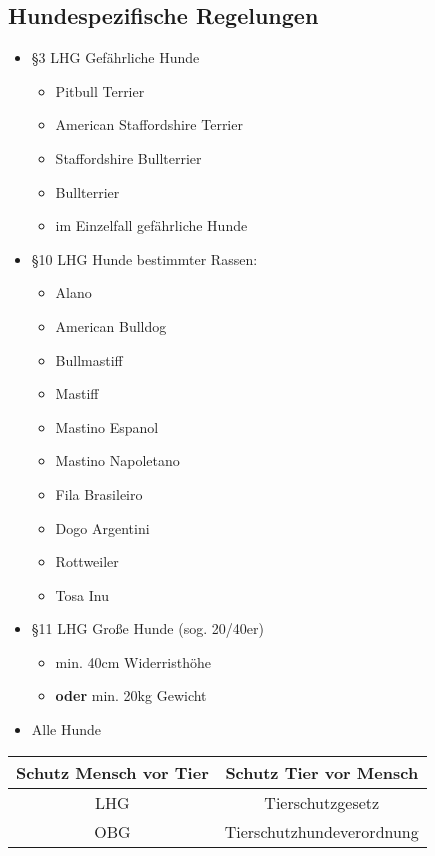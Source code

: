     \subsection{Hundespezifische Regelungen}
    \begin{itemize}
        \item §3 LHG Gefährliche Hunde
        \begin{itemize}
            \item Pitbull Terrier
            \item American Staffordshire Terrier
            \item Staffordshire Bullterrier
            \item Bullterrier
            \item im Einzelfall gefährliche Hunde
        \end{itemize}
        \item §10 LHG Hunde bestimmter Rassen:
        \begin{itemize}
            \item Alano
            \item American Bulldog
            \item Bullmastiff
            \item Mastiff
            \item Mastino Espanol
            \item Mastino Napoletano
            \item Fila Brasileiro
            \item Dogo Argentini
            \item Rottweiler
            \item Tosa Inu
        \end{itemize}
        \item §11 LHG Große Hunde (sog. 20/40er)
        \begin{itemize}
            \item min. 40cm Widerristhöhe
            \item \textbf{oder} min. 20kg Gewicht
        \end{itemize}
        \item Alle Hunde
    \end{itemize}

    \begin{tabular}{c|c}
        \textbf{Schutz Mensch vor Tier} & \textbf{Schutz Tier vor Mensch} \\
        \hline
        LHG & Tierschutzgesetz \\
        OBG & Tierschutzhundeverordnung \\
    \end{tabular}


